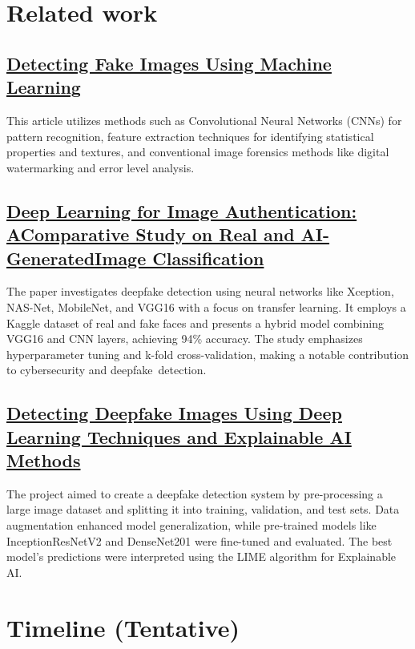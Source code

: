 \documentclass[10pt,twocolumn,letterpaper]{article}
\begin{document}
\section{Related work}

\subsection{\href{https://ijrpr.com/uploads/V4ISSUE4/IJRPR11629.pdf}{Detecting Fake Images Using Machine Learning}}
This article utilizes methods such as Convolutional Neural Networks (CNNs) for pattern recognition, feature extraction techniques for identifying statistical properties and textures, and conventional image forensics methods like digital watermarking and error level analysis.
\subsection{\href{https://www.researchgate.net/publication/375952278_Deep_Learning_for_Image_Authentication_A_Comparative_Study_on_Real_and_AI-Generated_Image_Classification}{Deep Learning for Image Authentication: AComparative Study on Real and AI-GeneratedImage Classification}}
The paper investigates deepfake detection using neural networks like Xception, NAS-Net, MobileNet, and VGG16 with a focus on transfer learning. It employs a Kaggle dataset of real and fake faces and presents a hybrid model combining VGG16 and CNN layers, achieving 94\% accuracy. The study emphasizes hyperparameter tuning and k-fold cross-validation, making a notable contribution to cybersecurity and deepfake detection.
\subsection{\href{https://www.techscience.com/iasc/v35n2/48928/html}{Detecting Deepfake Images Using Deep Learning Techniques and Explainable AI Methods}}
The project aimed to create a deepfake detection system by pre-processing a large image dataset and splitting it into training, validation, and test sets. Data augmentation enhanced model generalization, while pre-trained models like InceptionResNetV2 and DenseNet201 were fine-tuned and evaluated. The best model's predictions were interpreted using the LIME algorithm for Explainable AI.

\section{Timeline (Tentative)}
\end{document}
